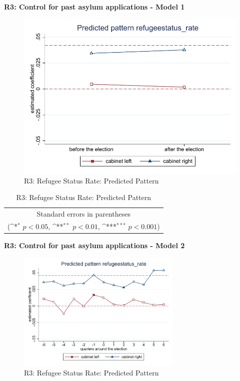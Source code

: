 \documentclass[10pt,a4paper]{scrartcl}
\begin{document}
\clearpage
\textbf{R3: Control for past asylum applications - Model 1}
\begin{figure}[!ht]
	\centering
	\includegraphics[width=1\textwidth]{figures_edited/refugeestatus_rate_graph1_R3.pdf}
	\caption{R3: Refugee Status Rate: Predicted Pattern}
\end{figure}

\begin{table}[!ht]\centering
	\renewcommand{\arraystretch}{1.25}
	\def\sym#1{\ifmmode^{#1}\else\(^{#1}\)\fi}
	\caption{R3: Refugee Status Rate: Predicted Pattern}
	\begin{tabular}{l*{2}{c}}
		\hline\hline
		
		\hline\hline
		\multicolumn{3}{c}{\footnotesize Standard errors in parentheses} \\
		\multicolumn{3}{c}{\footnotesize (\sym{*} \(p<0.05\), \sym{**} \(p<0.01\), \sym{***} \(p<0.001\))}\\
	\end{tabular}
\end{table}

\clearpage
\textbf{R3: Control for past asylum applications - Model 2}
\begin{figure}[!ht]
	\centering
	\includegraphics[width=0.7\textwidth]{figures_edited/refugeestatus_rate_graph2_R3.pdf}
	\caption{R3: Refugee Status Rate: Predicted Pattern}
\end{figure}
\end{document}
